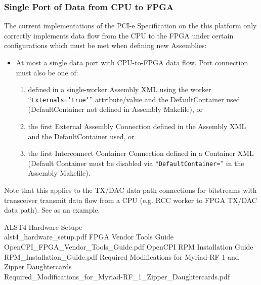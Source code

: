 \documentclass{article}
\begin{document}
\subsubsection*{Single Port of Data from CPU to FPGA} %
\label{bug:3783}
The current implementations of the PCI-e Specification on the this platform only correctly implements data flow from the CPU to the FPGA under certain configurations which must be met when defining new Assemblies:
\begin{itemize}
\item At most a single data port with CPU-to-FPGA data flow. Port connection must also be one of:
\begin{enumerate}
\item defined in a single-worker Assembly XML using the worker ``\texttt{Externals='true'}'' attribute/value and the DefaultContainer used (DefaultContainer not defined in Assembly Makefile), or
\item the first External Assembly Connection defined in the Assembly XML and the DefaultContainer used, or
\item the first Interconnect Container Connection defined in a Container XML (Default Container must be disabled via ``\texttt{DefaultContainer=}'' in the Assembly Makefile).
\end{enumerate}
\end{itemize}
Note that this applies to the TX/DAC data path connections for bitstreams with transceiver transmit data flow from a CPU (e.g. RCC worker to FPGA TX/DAC data path). See  as an example.

\pagebreak
  \begin{thebibliography}{1}


   ALST4 Hardware Setupe\\
	 alst4\_hardware\_setup.pdf
   FPGA Vendor Tools Guide\\
	 OpenCPI\_FPGA\_Vendor\_Tools\_Guide.pdf
	    OpenCPI RPM Installation Guide\\
	 RPM\_Installation\_Guide.pdf
	    Required Modifications for Myriad-RF 1 and Zipper Daughtercards\\
	 Required\_Modifications\_for\_Myriad-RF\_1\_Zipper\_Daughtercards.pdf

  \end{thebibliography}
\end{document}
